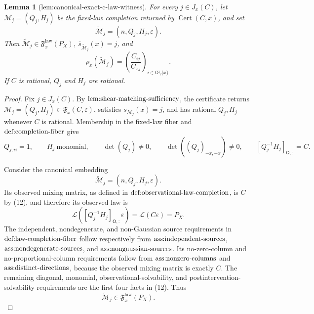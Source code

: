 \documentclass{article}
\newtheorem{lemma}{Lemma}
\begin{document}
\begin{lemma}[lem:canonical-exact-c-law-witness]\label{lem:canonical-exact-c-law-witness}
For every \(j\in J_x(C)\), let \(\mathcal M_j=(Q_j,H_j)\) be the fixed-law completion returned by \(\operatorname{Cert}(C,x)\), and set
\[
 \widetilde{\mathcal M}_j=(n,Q_j,H_j,\varepsilon).
\]
Then \(\widetilde{\mathcal M}_j\in\mathfrak F_x^{\mathrm{law}}(P_X)\), \(\bar s_{\widetilde{\mathcal M}_j}(x)=j\), and
\[
 \rho_x(\widetilde{\mathcal M}_j)
 =\left(\frac{C_{ij}}{C_{xj}}\right)_{i\in\mathsf O\setminus\{x\}}.
\]
If \(C\) is rational, \(Q_j\) and \(H_j\) are rational.
\end{lemma}
\begin{proof}
Fix \(j\in J_x(C)\).  By \(\textnormal{lem:shear-matching-sufficiency}\), the certificate returns \(\mathcal M_j=(Q_j,H_j)\in\mathfrak F_x(C,\varepsilon)\), satisfies \(s_{\mathcal M_j}(x)=j\), and has rational \(Q_j,H_j\) whenever \(C\) is rational.  Membership in the fixed-law fiber and \(\textnormal{def:completion-fiber}\) give
\[
 Q_{j,ii}=1,\qquad
 H_j\ \text{monomial},\qquad
 \det(Q_j)\ne0,\qquad
 \det((Q_j)_{-x,-x})\ne0,\qquad
 [Q_j^{-1}H_j]_{\mathsf O,:}=C.                                            \tag{12}
\]

Consider the canonical embedding
\[
 \widetilde{\mathcal M}_j=(n,Q_j,H_j,\varepsilon).
\]
Its observed mixing matrix, as defined in \(\textnormal{def:observational-law-completion}\), is \(C\) by (12), and therefore its observed law is
\[
 \mathcal L\!\left([Q_j^{-1}H_j]_{\mathsf O,:}\varepsilon\right)
 =\mathcal L(C\varepsilon)=P_X.                                            \tag{13}
\]
The independent, nondegenerate, and non-Gaussian source requirements in \(\textnormal{def:law-completion-fiber}\) follow respectively from \(\textnormal{ass:independent-sources}\), \(\textnormal{ass:nondegenerate-sources}\), and \(\textnormal{ass:nongaussian-sources}\).  Its no-zero-column and no-proportional-column requirements follow from \(\textnormal{ass:nonzero-columns}\) and \(\textnormal{ass:distinct-directions}\), because the observed mixing matrix is exactly \(C\).  The remaining diagonal, monomial, observational-solvability, and postintervention-solvability requirements are the first four facts in (12).  Thus
\[
 \widetilde{\mathcal M}_j\in\mathfrak F_x^{\mathrm{law}}(P_X).              \tag{14}
\]


\end{proof}
\end{document}
